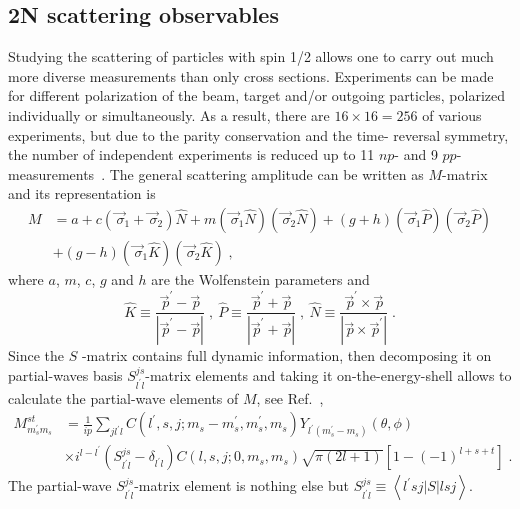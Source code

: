 \subsection{2N scattering observables}
\label{2N}
Studying the scattering of particles with spin 1/2 allows one to carry out much more diverse measurements than only cross sections. Experiments can be made for different polarization of the beam, target and/or outgoing particles, polarized individually or simultaneously. As a result, there are $ 16 \times 16 = 256$ of various experiments, but due to the parity conservation and the time- reversal symmetry, the number of independent experiments is reduced up to 11 $np$- and 9 $pp$-measurements~\cite{glockle1983quantum}. 
The general scattering amplitude can be written as $M$-matrix and its representation is 
\begin{equation}
\begin{split}
M &= a + c\left(\!\vec{\,\sigma}_{1} + \!\vec{\,\sigma}_{2}\right)\hat{N} + m\left(\!\vec{\,\sigma}_{1}\hat{N}\right)\left(\!\vec{\,\sigma}_{2}\hat{N}\right) + (g + h)\left(\!\vec{\,\sigma}_{1}\hat{P}\right)\left(\!\vec{\,\sigma}_{2}\hat{P}\right)\\
&+(g - h)\left(\!\vec{\,\sigma}_{1}\hat{K}\right)\left(\!\vec{\,\sigma}_{2}\hat{K}\right)\;,
\end{split}
\end{equation}
where $a$, $m$, $c$, $g$ and $h$ are the Wolfenstein parameters and 
\begin{equation}
\hat{K} \equiv \frac{\!\vec{\, p}^{\prime} - \!\vec{\, p}}{|\!\vec{\, p}^{\prime} - \!\vec{\, p}|}\;,~\hat{P} \equiv \frac{\!\vec{\, p}^{\prime} + \!\vec{\, p}}{|\!\vec{\, p}^{\prime} + \!\vec{\, p}|}\;,~\hat{N} \equiv \frac{\!\vec{\, p}^{\prime} \times \!\vec{\, p}}{|\!\vec{\, p} \times \!\vec{\, p}^{\prime} |}\;.
\end{equation}
Since the $S$ -matrix contains full dynamic information, then decomposing it on partial-waves basis $S^{js}_{l^{\prime}l}$-matrix elements and taking it on-the-energy-shell allows to calculate the partial-wave elements of $M$, see Ref.~\cite{glockle1983quantum},
\begin{equation}
\begin{split}
M^{st}_{m^{\prime}_{s}m_{s}} &= \frac{1}{ip}\sum\limits_{jl^{\prime}l}C\left(l^{\prime}, s,j;m_{s} - m^{\prime}_{s},m^{\prime}_{s},m_{s}\right)Y_{l^{\prime}(m^{\prime}_{s} - m_{s})}(\theta,\phi)\\
&\times i^{l-l^{\prime}}\left(S^{js}_{l^{\prime}l} - \delta_{l^{\prime}l}\right)C\left(l, s,j;0,m_{s},m_{s}\right)\sqrt{\pi(2l + 1)}\left[1 - (-1)^{l+s+t}\right]\;.
\end{split}
\end{equation}
The partial-wave $S^{js}_{l^{\prime}l}$-matrix element is nothing else but $S^{js}_{l^{\prime}l} \equiv \left<l^{\prime}sj|S|lsj\right>$.

